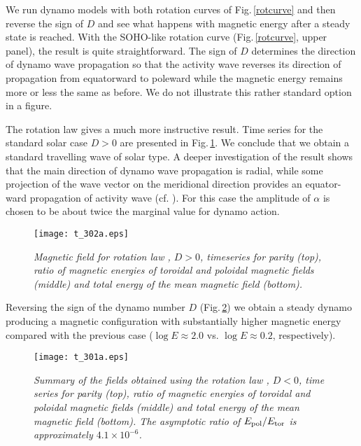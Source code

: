 \documentclass[fleqn,12pt]{SelfArx} %
\begin{document}
We run dynamo models with both rotation curves of Fig.\,\ref{rotcurve} and then reverse the sign of $D$ and see 
what happens with magnetic energy after a steady state is reached.
With the SOHO-like rotation curve (Fig.\,\ref{rotcurve}, upper panel), the result is quite straightforward. The 
sign of $D$ determines the direction of dynamo wave propagation so  that the activity wave reverses its direction 
of propagation from equatorward to poleward while the magnetic energy remains more or less the same as before. We 
do not illustrate this rather standard option in a figure.

The \cite{32} rotation law gives a much more instructive result.
Time series for the standard solar case $D>0$ are presented in Fig.\,\ref{Dpos}.
We conclude that we obtain a standard travelling wave of solar type.
A deeper investigation of the result shows that the main direction of dynamo wave propagation is radial, while 
some projection of the wave vector on the meridional direction provides an equator-ward propagation of activity wave (cf. \cite{33}).
For this case the amplitude of $\alpha$ is chosen to be about twice the  marginal value for dynamo action.

\begin{figure}
\texttt{[image: t\_302a.eps]}
\caption{\normalsize\sl Magnetic field for  rotation law \cite{32}, $D>0$, timeseries for parity (top), ratio of
magnetic energies of toroidal and poloidal magnetic fields (middle) and total energy of the mean magnetic
field  (bottom).}
\label{Dpos}
\end{figure}

Reversing the sign of the dynamo number $D$ (Fig.\,\ref{Dneg}) we obtain a steady dynamo producing a magnetic 
configuration with substantially higher magnetic energy
compared with the previous case ($\log E \approx 2.0$ vs. $\log E \approx 0.2$, respectively).

\begin{figure}
\begin{center}

\texttt{[image: t\_301a.eps]}

\end{center}
\caption{\normalsize\sl Summary of the fields obtained using the  rotation law \cite{32}, $D<0$, 
time series for parity (top), ratio of
magnetic energies of toroidal and poloidal magnetic fields (middle) and total energy of the mean magnetic
field  (bottom). The asymptotic ratio of $E_{\rm pol}/E_{\rm tor}$ is approximately $4.1 \times  10^{-6}$.}
\label{Dneg}
\end{figure}
\end{document}
